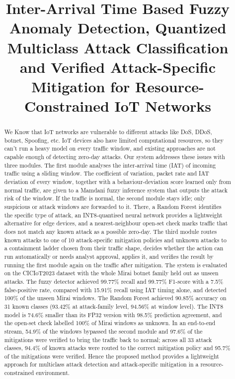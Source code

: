 \documentclass[]{interact}
\theoremstyle{plain}%
\theoremstyle{definition}
\theoremstyle{remark}
\begin{document}
\title{Inter-Arrival Time Based Fuzzy Anomaly Detection, Quantized Multiclass Attack Classification and Verified Attack-Specific Mitigation for Resource-Constrained IoT Networks}

\maketitle

\begin{abstract}
We Know that IoT networks are vulnerable to different attacks like DoS, DDoS, botnet, Spoofing, etc. IoT devices also have limited computational resources, so they can't run a heavy model on every traffic window, and existing approaches are not capable enough of detecting zero-day attacks. Our system addresses these issues with three modules. The first module analyses the inter-arrival time (IAT) of incoming traffic using a sliding window. The coefficient of variation, packet rate and IAT deviation of every window, together with a behaviour-deviation score learned only from normal traffic, are given to a Mamdani fuzzy inference system that outputs the attack risk of the window. If the traffic is normal, the second module stays idle; only suspicious or attack windows are forwarded to it. There, a Random Forest identifies the specific type of attack, an INT8-quantised neural network provides a lightweight alternative for edge devices, and a nearest-neighbour open-set check marks traffic that does not match any known attack as a possible zero-day. The third module routes known attacks to one of 10 attack-specific mitigation policies and unknown attacks to a containment ladder chosen from their traffic shape, decides whether the action can run automatically or needs analyst approval, applies it, and verifies the result by running the first module again on the traffic after mitigation. The system is evaluated on the CICIoT2023 dataset with the whole Mirai botnet family held out as unseen attacks. The fuzzy detector achieved 99.77\% recall and 99.77\% F1-score with a 7.5\% false-positive rate, compared with 15.91\% recall using IAT timing alone, and detected 100\% of the unseen Mirai windows. The Random Forest achieved 90.85\% accuracy on 31 known classes (93.42\% at attack-family level, 94.56\% at window level). The INT8 model is 74.6\% smaller than its FP32 version with 98.5\% prediction agreement, and the open-set check labelled 100\% of Mirai windows as unknown. In an end-to-end stream, 54.9\% of the windows bypassed the second module and 97.6\% of the mitigations were verified to bring the traffic back to normal; across all 33 attack classes, 94.4\% of known attacks were routed to the correct mitigation policy and 95.7\% of the mitigations were verified. Hence the proposed method provides a lightweight approach for multiclass attack detection and attack-specific mitigation in a resource-constrained environment.
\end{abstract}
\end{document}
